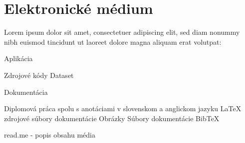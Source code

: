 
\chapter{Elektronické médium}
Lorem ipsum dolor sit amet, consectetuer adipiscing elit, sed diam nonummy nibh euismod tincidunt ut laoreet dolore magna aliquam erat volutpat:
\begin{my_itemize}
	\item Aplikácia
	\begin{my_itemize}
		\myitem Zdrojové kódy
		\myitem Dataset
	\end{my_itemize}	
	\item Dokumentácia
	\begin{my_itemize}
		\myitem Diplomová práca spolu s anotáciami v slovenskom a anglickom jazyku
		\myitem LaTeX zdrojové súbory dokumentácie
		\myitem Obrázky
		\myitem Súbory dokumentácie BibTeX
	\end{my_itemize}	
	\item read.me	- popis obsahu média
\end{my_itemize}